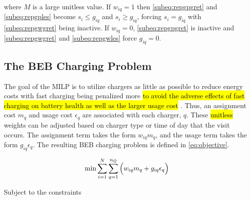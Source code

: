 \documentclass[utf8]{FrontiersinHarvard}
\begin{document}
\noindent where \(M\) is a large unitless value. If \(w_{iq} = 1\) then \autoref{subeq:repgpgret} and
\autoref{subeq:repgples} become \(s_i \leq g_{iq}\) and \(s_i \geq g_{iq}\), forcing \(s_i = g_{iq}\) with \autoref{subeq:repgwgret}
being inactive. If \(w_{iq} = 0\), \autoref{subeq:repgpgret} is inactive and \autoref{subeq:repgwgret} and
\autoref{subeq:repgwles} force \(g_{iq} = 0\).

\subsection{The BEB Charging Problem}
\label{sec:BEB_MILP}
The goal of the MILP is to utilize chargers as little as possible to reduce energy costs with fast charging being
penalized more \hl{to avoid the adverse effects of fast charging on battery health as well as the larger usage cost }. Thus, an assignment cost \(m_q\) and usage cost \(\epsilon_q\) are associated with each charger, \(q\). These
\hl{unitless} weights can be adjusted based on charger type or time of day that the visit occurs. The
assignment term takes the form \(w_{iq}m_q\), and the usage term takes the form \(g_{iq} \epsilon_q\). The resulting BEB charging
problem is defined in \autoref{eq:objective}.

\begin{equation}
\label{eq:objective}
	\min \sum_{i=1}^N \sum_{q=1}^{n_Q} \Big( w_{iq} m_q + g_{iq} \epsilon_q \Big) \\
\end{equation}

Subject to the constraints
\end{document}
